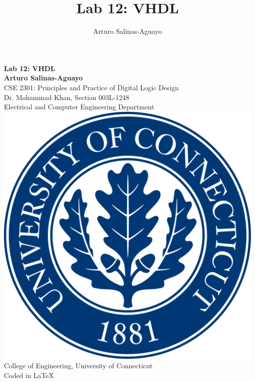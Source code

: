 \documentclass[12pt]{article}
\author{Arturo Salinas-Aguayo}
\title{Lab 12: VHDL}
\begin{document}
\newcommand{\closure}[2][3]{%
	{}\mkern#1mu\overline{\mkern-#1mu#2}}
\newcommand\ncoverline[1]{\mkern1mu\overline{\mkern-1mu#1\mkern-1mu}\mkern1mu}
\begin{titlepage}
	\centering
	\vspace*{3cm}
	\huge\textbf{Lab 12: VHDL}\\
	\vspace{5cm}
	\Large\textbf{Arturo Salinas-Aguayo}\\
	\normalsize
	CSE 2301: Principles and Practice of Digital Logic Design\\
	Dr. Mohammad Khan, Section 003L-1248\\
	Electrical and Computer Engineering Department
	\vfill
	\includegraphics[scale=0.1]{uconnlogo}\\
	College of Engineering, University of Connecticut\\
	\scriptsize{Coded in \LaTeX}
	\vspace*{1cm}
\end{titlepage}
\end{document}

